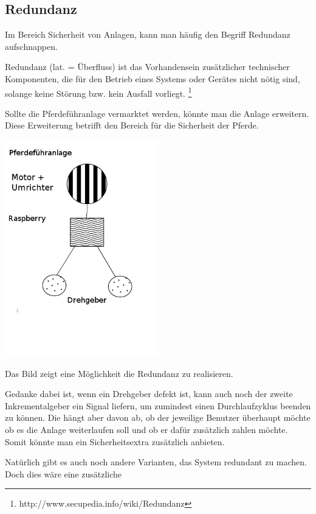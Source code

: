 \subsection{Redundanz}
\label{sec:redundanz}

Im Bereich Sicherheit von Anlagen, kann man häufig den Begriff Redundanz aufschnappen. 

 Redundanz (lat. = Überfluss) ist das Vorhandensein zusätzlicher technischer Komponenten, die für den Betrieb eines Systems oder Gerätes nicht nötig sind, solange keine Störung bzw. kein Ausfall vorliegt. \footnote{http://www.secupedia.info/wiki/Redundanz}

Sollte die Pferdeführanlage vermarktet werden, könnte man die Anlage erweitern. Diese Erweiterung betrifft den Bereich für die Sicherheit der Pferde.

\begin{center}
	\includegraphics[width=0.5\textwidth]{Redundanz}
\end{center}

Das Bild zeigt eine Möglichkeit die Redundanz zu realisieren.

Gedanke dabei ist, wenn ein Drehgeber defekt ist, kann auch noch der zweite Inkrementalgeber ein Signal liefern, um zumindest einen Durchlaufzyklus beenden zu können. Die hängt aber davon ab, ob der jeweilige Benutzer überhaupt möchte ob es die Anlage weiterlaufen soll und ob er dafür zusätzlich zahlen möchte. Somit könnte man ein Sicherheitsextra zusätzlich anbieten.

Natürlich gibt es auch noch andere Varianten, das System redundant zu machen. Doch dies wäre eine zusätzliche 
